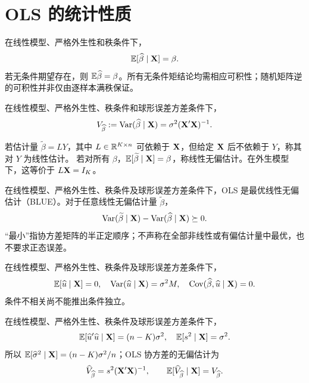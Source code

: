 \section{OLS 的统计性质}

\begin{theorem}[无偏性]\label{reg:entry:49}
在线性模型、严格外生性和秩条件下，
\[\mathbb{E}[\widehat{\beta}\mid\mathbf{X}]=\beta.\]
若无条件期望存在，则 $\mathbb{E}\widehat{\beta}=\beta$。所有无条件矩结论均需相应可积性；随机矩阵逆的可积性并非仅由逐样本满秩保证。
\end{theorem}

\begin{theorem}\label{reg:entry:50}
在线性模型、严格外生性、秩条件和球形误差方差条件下，
\[V_{\widehat{\beta}}:=\operatorname{Var}(\widehat{\beta}\mid\mathbf{X})=\sigma^2(\mathbf{X}'\mathbf{X})^{-1}.\]
\end{theorem}

\begin{definition}[线性无偏估计量]\label{reg:entry:51}
若估计量 $\widetilde\beta=L Y$，其中 $L\in\mathbb{R}^{K\times n}$ 可依赖于 $\mathbf{X}$，但给定 $\mathbf{X}$ 后不依赖于 $Y$，称其对 $Y$ 为线性估计。
若对所有 $\beta$，$\mathbb{E}[\widetilde\beta\mid\mathbf{X}]=\beta$，称线性无偏估计。在外生模型下，这等价于 $L\mathbf{X}=I_K$。
\end{definition}

\begin{theorem}\label{reg:entry:52}
在线性模型、严格外生性、秩条件及球形误差方差条件下，OLS 是最优线性无偏估计（BLUE）。对于任意线性无偏估计量 $\widetilde\beta$，
\[\operatorname{Var}(\widetilde\beta\mid\mathbf{X})-\operatorname{Var}(\widehat{\beta}\mid\mathbf{X})\succeq0.\]
“最小”指协方差矩阵的半正定顺序；不声称在全部非线性或有偏估计量中最优，也不要求正态误差。
\end{theorem}

\begin{theorem}[残差的矩性质]\label{reg:entry:53}
在线性模型、严格外生性、秩条件及球形误差方差条件下，
\[\mathbb{E}[\widehat{u}\mid\mathbf{X}]=0,\quad \operatorname{Var}(\widehat{u}\mid\mathbf{X})=\sigma^2M,\quad \operatorname{Cov}(\widehat{\beta},\widehat{u}\mid\mathbf{X})=0.\]
条件不相关尚不能推出条件独立。
\end{theorem}

\begin{theorem}[方差估计的无偏性]\label{reg:entry:54}
在线性模型、严格外生性、秩条件及球形误差方差条件下，
\[\mathbb{E}[\widehat{u}'\widehat{u}\mid\mathbf{X}]=(n-K)\sigma^2,\quad \mathbb{E}[s^2\mid\mathbf{X}]=\sigma^2.\]
所以 $\mathbb{E}[\widehat\sigma^2\mid\mathbf{X}]=(n-K)\sigma^2/n$；OLS 协方差的无偏估计为
\[\widehat V_{\widehat{\beta}}=s^2(\mathbf{X}'\mathbf{X})^{-1},\qquad \mathbb{E}[\widehat V_{\widehat{\beta}}\mid\mathbf{X}]=V_{\widehat{\beta}}.\]
\end{theorem}

